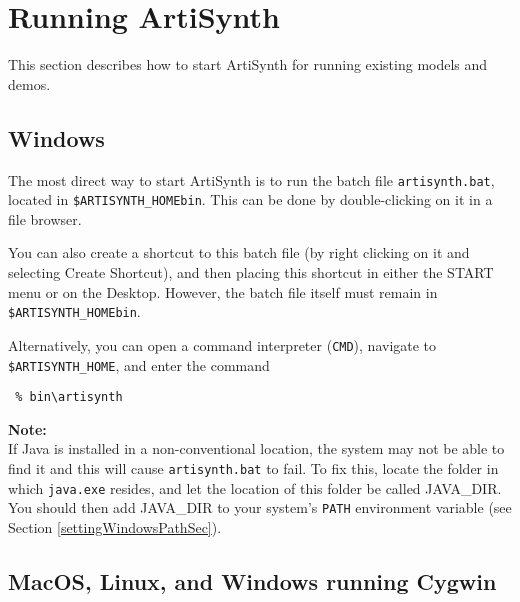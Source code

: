 \documentclass{article}
\begin{document}
\section{Running ArtiSynth}
\label{RunningArtisynthSec}

This section describes how to start ArtiSynth for running
existing models and demos. 

\subsection{Windows}

The most direct way to start ArtiSynth is to run the batch file
{\tt artisynth.bat}, located in {\tt \$ARTISYNTH\_HOME\BKS bin}.  This can be
done by double-clicking on it in a file browser.

You can also create a shortcut to this batch file (by right clicking
on it and selecting {\sf Create Shortcut}), and then placing this shortcut
in either the {\sf START} menu or on the Desktop. However, the batch file
itself must remain in {\tt \$ARTISYNTH\_HOME\BKS bin}.

Alternatively, you can open a command interpreter ({\tt CMD}), navigate
to {\tt \$ARTISYNTH\_HOME}, and enter the command

\begin{verbatim}
 % bin\artisynth
\end{verbatim}

\begin{sideblock}
{\bf Note:}\\
If Java is installed in a non-conventional location, the system may
not be able to find it and this will cause {\tt artisynth.bat} to fail.
To fix this, locate the folder in which {\tt java.exe} resides, and let
the location of this folder be called JAVA\_DIR. You should then add
JAVA\_DIR to your system's {\tt PATH} environment variable (see
Section \ref{settingWindowsPathSec}).  
\end{sideblock}

%

\subsection{MacOS, Linux, and Windows running Cygwin}
\end{document}

